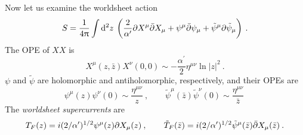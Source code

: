 Now let us examine the worldsheet action
\begin{equation}
	S=\frac{1}{4\uppi}\int\mathrm{d}^{2}z \:
	\left(
	\frac{2}{\alpha^{\prime}}\partial X^{\mu}\bar{\partial}X_{\mu} +\psi^{\mu}\bar{\partial}\psi_{\mu}
	+\tilde{\psi}^{\mu}\partial\tilde{\psi}_{\mu}
	\right)\:.\label{10.1.5}
\end{equation}
The OPE of $XX$ is
\begin{equation}
	X^{\mu}(z,\bar{z})X^{\nu}(0,0)\sim -\frac{\alpha^{\prime}}{2}\eta^{\mu\nu}\ln\lvert z\rvert^{2}\:.\label{10.1.6}
\end{equation}
$\psi$ and $\tilde{\psi}$ are holomorphic and antiholomorphic, respectively, and their OPEs are
\begin{equation}
	\psi^{\mu}(z)\psi^{\nu}(0)\sim\frac{\eta^{\mu\nu}}{z}\:,\qquad
	\tilde{\psi}^{\mu}(\bar{z})\tilde{\psi}^{\nu}(0)\sim\frac{\eta^{\mu\nu}}{\bar{z}}\: \label{10.1.7}
\end{equation}
The \emph{worldsheet supercurrents} are
\begin{equation}
	T_{F}(z)=i(2/\alpha^{\prime})^{1/2}\psi^{\mu}(z)\partial X_{\mu}(z)\:,\qquad
	\tilde{T}_{F}(\bar{z})=i(2/\alpha^{\prime})^{1/2}\tilde{\psi}^{\mu}(\bar{z})\bar{\partial} X_{\mu}(\bar{z})
	\:.\label{10.1.8}
\end{equation}

